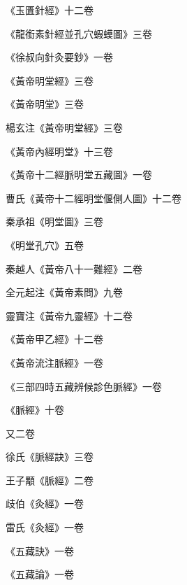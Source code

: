 \begin{pinyinscope}
 《玉匱針經》十二卷



 《龍銜素針經並孔穴蝦蟆圖》三卷



 《徐叔向針灸要鈔》一卷



 《黃帝明堂經》三卷



 《黃帝明堂》三卷



 楊玄注《黃帝明堂經》三卷



 《黃帝內經明堂》十三卷



 《黃帝十二經脈明堂五藏圖》一卷



 曹氏《黃帝十二經明堂偃側人圖》十二卷



 秦承祖《明堂圖》三卷



 《明堂孔穴》五卷



 秦越人《黃帝八十一難經》二卷



 全元起注《黃帝素問》九卷



 靈寶注《黃帝九靈經》十二卷



 《黃帝甲乙經》十二卷



 《黃帝流注脈經》一卷



 《三部四時五藏辨候診色脈經》一卷



 《脈經》十卷



 又二卷



 徐氏《脈經訣》三卷



 王子顒《脈經》二卷



 歧伯《灸經》一卷



 雷氏《灸經》一卷



 《五藏訣》一卷



 《五藏論》一卷




\end{pinyinscope}
